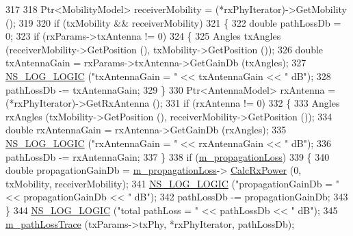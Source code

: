\begin{DoxyCode}
317 
318               Ptr<MobilityModel> receiverMobility = (*rxPhyIterator)->GetMobility ();
319 
320               \textcolor{keywordflow}{if} (txMobility && receiverMobility)
321                 \{
322                   \textcolor{keywordtype}{double} pathLossDb = 0;
323                   \textcolor{keywordflow}{if} (rxParams->txAntenna != 0)
324                     \{
325                       Angles txAngles (receiverMobility->GetPosition (), txMobility->GetPosition ());
326                       \textcolor{keywordtype}{double} txAntennaGain = rxParams->txAntenna->GetGainDb (txAngles);
327                       \hyperlink{group__logging_ga88acd260151caf2db9c0fc84997f45ce}{NS\_LOG\_LOGIC} (\textcolor{stringliteral}{"txAntennaGain = "} << txAntennaGain << \textcolor{stringliteral}{" dB"});
328                       pathLossDb -= txAntennaGain;
329                     \}
330                   Ptr<AntennaModel> rxAntenna = (*rxPhyIterator)->GetRxAntenna ();
331                   \textcolor{keywordflow}{if} (rxAntenna != 0)
332                     \{
333                       Angles rxAngles (txMobility->GetPosition (), receiverMobility->GetPosition ());
334                       \textcolor{keywordtype}{double} rxAntennaGain = rxAntenna->GetGainDb (rxAngles);
335                       \hyperlink{group__logging_ga88acd260151caf2db9c0fc84997f45ce}{NS\_LOG\_LOGIC} (\textcolor{stringliteral}{"rxAntennaGain = "} << rxAntennaGain << \textcolor{stringliteral}{" dB"});
336                       pathLossDb -= rxAntennaGain;
337                     \}
338                   \textcolor{keywordflow}{if} (\hyperlink{classns3_1_1MultiModelSpectrumChannel_a7b0ae25fd33c9fbccf4984526abb0827}{m\_propagationLoss})
339                     \{
340                       \textcolor{keywordtype}{double} propagationGainDb = \hyperlink{classns3_1_1MultiModelSpectrumChannel_a7b0ae25fd33c9fbccf4984526abb0827}{m\_propagationLoss}->
      \hyperlink{classns3_1_1PropagationLossModel_a8b42564e9b03e2197f17aab6692c4fee}{CalcRxPower} (0, txMobility, receiverMobility);
341                       \hyperlink{group__logging_ga88acd260151caf2db9c0fc84997f45ce}{NS\_LOG\_LOGIC} (\textcolor{stringliteral}{"propagationGainDb = "} << propagationGainDb << \textcolor{stringliteral}{" dB"});
342                       pathLossDb -= propagationGainDb;
343                     \}                    
344                   \hyperlink{group__logging_ga88acd260151caf2db9c0fc84997f45ce}{NS\_LOG\_LOGIC} (\textcolor{stringliteral}{"total pathLoss = "} << pathLossDb << \textcolor{stringliteral}{" dB"});    
345                   \hyperlink{classns3_1_1MultiModelSpectrumChannel_ab3333c1804de2472073cf3725f6f7f59}{m\_pathLossTrace} (txParams->txPhy, *rxPhyIterator, pathLossDb);

\end{DoxyCode}
